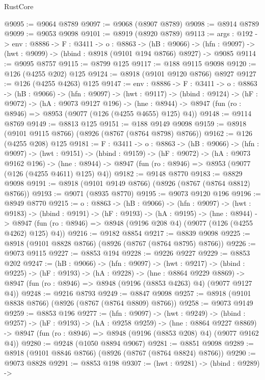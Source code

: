 \begin{lexlean}{RustCore}
\begin{coremodule}
@9095 := @9064 @8789
@9097 := @9068 (@8907 @8789)
@9098 := @8914 @8789
@9099 := @9053 @9098
@9101 := @8919 (@8920 @8789)
@9113 := {args : @192} ->
  {env : @8886} ->
  {F : @3411} ->
  {o : @8863} ->
  (hB : @9066) ->
  (hfn : @9097) -> (hwt : @9099) -> (hbind : @8918 (@9101 @194 @8766) @8927) -> @9085
@9114 := @9095 @8757
@9115 := @8799 @125
@9117 := @188 @9115 @9098
@9120 := @126 (@4255 @202) @125
@9124 := @8918 (@9101 @9120 @8766) @8927
@9127 := @126 (@4255 @4263) @125
@9147 := {env : @8886} ->
  {F : @3411} ->
  {o : @8863} ->
  (hB : @9066) ->
  (hfn : @9097) ->
  (hwt : @9117) ->
  (hbind : @9124) ->
  (hF : @9072) ->
  (hA : @9073 @9127 @196) ->
  (hne : @8944) -> @8947 (fun (ro : @8946) => @8953 (@9077 (@126 (@4255 @4655) @125) @4))
@9148 := @9114 @8769
@9149 := @8813 @125
@9151 := @188 @9149 @9098
@9159 := @8918 (@9101 @9115 @8766) (@8926 (@8767 (@8764 @8798) @8766))
@9162 := @126 (@4255 @208) @125
@9181 := {F : @3411} ->
  {o : @8863} ->
  (hB : @9066) ->
  (hfn : @9097) ->
  (hwt : @9151) ->
  (hbind : @9159) ->
  (hF : @9072) ->
  (hA : @9073 @9162 @196) ->
  (hne : @8944) -> @8947 (fun (ro : @8946) => @8953 (@9077 (@126 (@4255 @4611) @125) @4))
@9182 := @9148 @8770
@9183 := @8829 @9098
@9191 := @8918 (@9101 @9149 @8766) (@8926 (@8767 (@8764 @8812) @8766))
@9193 := @9071 (@8935 @8770)
@9195 := @9073 @9120 @196
@9196 := @8949 @8770
@9215 := {o : @8863} ->
  (hB : @9066) ->
  (hfn : @9097) ->
  (hwt : @9183) ->
  (hbind : @9191) ->
  (hF : @9193) ->
  (hA : @9195) ->
  (hne : @8944) ->
  @8947 (fun (ro : @8946) => @8948 (@9196 @208 @4) (@9077 (@126 (@4255 @4262) @125) @4))
@9216 := @9182 @8854
@9217 := @8839 @9098
@9225 := @8918 (@9101 @8828 @8766) (@8926 (@8767 (@8764 @8795) @8766))
@9226 := @9073 @9115
@9227 := @8853 @194
@9228 := @9226 @9227
@9229 := @8853 @202
@9247 := (hB : @9066) ->
  (hfn : @9097) ->
  (hwt : @9217) ->
  (hbind : @9225) ->
  (hF : @9193) ->
  (hA : @9228) ->
  (hne : @8864 @9229 @8869) ->
  @8947 (fun (ro : @8946) => @8948 (@9196 (@8853 @4263) @4) (@9077 @9127 @4))
@9248 := @9216 @8793
@9249 := @8847 @9098
@9257 := @8918 (@9101 @8838 @8766) (@8926 (@8767 (@8764 @8809) @8766))
@9258 := @9073 @9149
@9259 := @8853 @196
@9277 := (hfn : @9097) ->
  (hwt : @9249) ->
  (hbind : @9257) ->
  (hF : @9193) ->
  (hA : @9258 @9259) ->
  (hne : @8864 @9227 @8869) ->
  @8947 (fun (ro : @8946) => @8948 (@9196 (@8853 @208) @4) (@9077 @9162 @4))
@9280 := @9248 (@1050 @8894 @9067)
@9281 := @8851 @9098
@9289 := @8918 (@9101 @8846 @8766) (@8926 (@8767 (@8764 @8824) @8766))
@9290 := @9073 @8828
@9291 := @8853 @198
@9307 := (hwt : @9281) ->
  (hbind : @9289) ->

\end{coremodule}
\end{lexlean}
